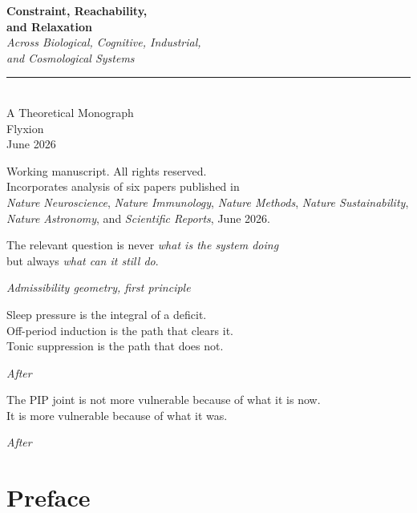 \documentclass[12pt, a4paper, twoside]{book}
\theoremstyle{definition}
\theoremstyle{remark}
\begin{document}
\frontmatter

\begin{titlepage}
\vspace*{50pt}
{\raggedleft
  {\fontsize{28}{34}\selectfont\bfseries\color{RSVPblue}
    Constraint, Reachability,\\[4pt] and Relaxation}\\[18pt]
  {\large\color{RSVPblue!60}\itshape
    Across Biological, Cognitive, Industrial,\\
    and Cosmological Systems}\\[40pt]
  \rule{0.55\textwidth}{0.5pt}\\[20pt]
  {\large A Theoretical Monograph}\\[10pt]
  {\large Flyxion}\\[6pt]
  {\normalsize June 2026}\\[60pt]
}
\vfill
{\small\color{gray}
  Working manuscript. All rights reserved.\\[3pt]
  Incorporates analysis of six papers published in\\
  \textit{Nature Neuroscience}, \textit{Nature Immunology},
  \textit{Nature Methods}, \textit{Nature Sustainability},\\
  \textit{Nature Astronomy}, and \textit{Scientific Reports},
  June 2026.
}
\end{titlepage}

\cleardoublepage\vspace*{100pt}
\epigraph{The relevant question is never \emph{what is the system doing}\\
  but always \emph{what can it still do}.}{\textit{Admissibility geometry, first principle}}
\vspace{36pt}
\epigraph{Sleep pressure is the integral of a deficit.\\
  Off-period induction is the path that clears it.\\
  Tonic suppression is the path that does not.}{\textit{After \citet{driessen2026}}}
\vspace{36pt}
\epigraph{The PIP joint is not more vulnerable because of what it is now.\\
  It is more vulnerable because of what it was.}{\textit{After \citet{davidson2026}}}

\cleardoublepage
\tableofcontents

\cleardoublepage
\chapter*{Preface}
\end{document}
